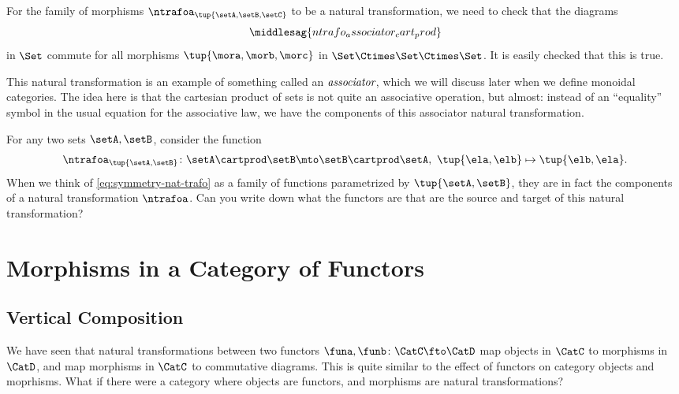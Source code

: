 \begin{example}
    For the family of morphisms $\ntrafoa_{\tup{\setA, \setB, \setC}}$ to be a natural transformation, we need to check that the diagrams
    \begin{equation}
        \label{eq:ntrafo_associator_cart_prod}
        \middlesag{ntrafo_associator_cart_prod}
    \end{equation}
    in $\Set$ commute for all morphisms $\tup{\mora, \morb, \morc}$ in $\Set \Ctimes \Set \Ctimes \Set$.
    It is easily checked that this is true.

    This natural transformation is an example of something called an $\emph{associator}$, which we will discuss later when we define monoidal categories.
    The idea here is that the cartesian product of sets is not quite an associative operation, but almost: instead of an ``equality'' symbol in the usual equation for the associative law, we have the components of this associator natural transformation.
\end{example}

\begin{example}
    For any two sets $\setA, \setB$, consider the function
    \begin{equation}\label{eq:symmetry-nat-trafo}
        \ntrafoa_{\tup{\setA, \setB}} \colon \setA \cartprod \setB \mto \setB \cartprod \setA, \ \tup{\ela, \elb} \mapsto \tup{\elb, \ela}.
    \end{equation}
    When we think of \cref{eq:symmetry-nat-trafo} as a family of functions parametrized by $\tup{\setA, \setB}$, they are in fact the components of a natural transformation $\ntrafoa$.
    Can you write down what the functors are that are the source and target of this natural transformation?
\end{example}



\section{Morphisms in a Category of Functors}
\subsection{Vertical Composition}

We have seen that natural transformations between two functors $\funa, \funb \colon \CatC \fto \CatD$ map objects in $\CatC$ to 
morphisms in $\CatD$, and map morphisms in $\CatC$ to commutative diagrams. This is quite similar to the effect of functors on category
objects and moprhisms. What if there were a category where objects are functors, and morphisms are natural transformations? 

